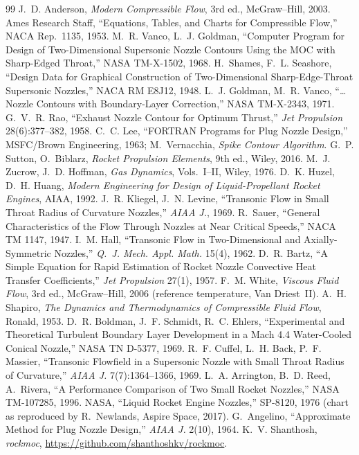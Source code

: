 \documentclass[10pt,a4paper]{article}
\begin{document}
\begin{thebibliography}{99}\small
{} J.~D. Anderson, \emph{Modern Compressible Flow}, 3rd ed., McGraw--Hill, 2003.
 Ames Research Staff, ``Equations, Tables, and Charts for Compressible Flow,'' NACA Rep.~1135, 1953.
 M.~R. Vanco, L.~J. Goldman, ``Computer Program for Design of Two-Dimensional Supersonic Nozzle Contours Using the MOC with Sharp-Edged Throat,'' NASA TM-X-1502, 1968.
 H.~Shames, F.~L. Seashore, ``Design Data for Graphical Construction of Two-Dimensional Sharp-Edge-Throat Supersonic Nozzles,'' NACA RM E8J12, 1948.
 L.~J. Goldman, M.~R. Vanco, ``\ldots Nozzle Contours with Boundary-Layer Correction,'' NASA TM-X-2343, 1971.
 G.~V.~R. Rao, ``Exhaust Nozzle Contour for Optimum Thrust,'' \emph{Jet Propulsion} 28(6):377--382, 1958.
 C.~C. Lee, ``FORTRAN Programs for Plug Nozzle Design,'' MSFC/Brown Engineering, 1963; M.~Vernacchia, \emph{Spike Contour Algorithm}.
 G.~P. Sutton, O.~Biblarz, \emph{Rocket Propulsion Elements}, 9th ed., Wiley, 2016.
 M.~J. Zucrow, J.~D. Hoffman, \emph{Gas Dynamics}, Vols.~I--II, Wiley, 1976.
 D.~K. Huzel, D.~H. Huang, \emph{Modern Engineering for Design of Liquid-Propellant Rocket Engines}, AIAA, 1992.
 J.~R. Kliegel, J.~N. Levine, ``Transonic Flow in Small Throat Radius of Curvature Nozzles,'' \emph{AIAA J.}, 1969.
 R.~Sauer, ``General Characteristics of the Flow Through Nozzles at Near Critical Speeds,'' NACA TM 1147, 1947.
 I.~M. Hall, ``Transonic Flow in Two-Dimensional and Axially-Symmetric Nozzles,'' \emph{Q.~J. Mech. Appl. Math.} 15(4), 1962.
 D.~R. Bartz, ``A Simple Equation for Rapid Estimation of Rocket Nozzle Convective Heat Transfer Coefficients,'' \emph{Jet Propulsion} 27(1), 1957.
 F.~M. White, \emph{Viscous Fluid Flow}, 3rd ed., McGraw--Hill, 2006 (reference temperature, Van Driest~II).
 A.~H. Shapiro, \emph{The Dynamics and Thermodynamics of Compressible Fluid Flow}, Ronald, 1953.
 D.~R. Boldman, J.~F. Schmidt, R.~C. Ehlers, ``Experimental and Theoretical Turbulent Boundary Layer Development in a Mach 4.4 Water-Cooled Conical Nozzle,'' NASA TN D-5377, 1969.
 R.~F. Cuffel, L.~H. Back, P.~F. Massier, ``Transonic Flowfield in a Supersonic Nozzle with Small Throat Radius of Curvature,'' \emph{AIAA J.} 7(7):1364--1366, 1969.
 L.~A. Arrington, B.~D. Reed, A.~Rivera, ``A Performance Comparison of Two Small Rocket Nozzles,'' NASA TM-107285, 1996.
 NASA, ``Liquid Rocket Engine Nozzles,'' SP-8120, 1976 (chart as reproduced by R.~Newlands, Aspire Space, 2017).
 G.~Angelino, ``Approximate Method for Plug Nozzle Design,'' \emph{AIAA J.} 2(10), 1964.
 K.~V. Shanthosh, \emph{rockmoc}, \url{https://github.com/shanthoshkv/rockmoc}.
\end{thebibliography}
\nocite{hall1962,bartz1957,white,rockmoc_repo}
\end{document}
